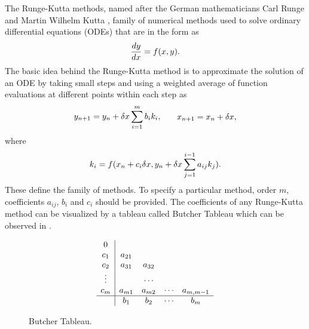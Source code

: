 \documentclass[a4paper,oneside,12pt]{report}
\numberwithin{equation}{chapter}
\begin{document}
The Runge-Kutta methods, named after the German mathematicians Carl Runge and Martin Wilhelm Kutta \cite{runge} \cite{kutta}, 
family of numerical methods
used to solve ordinary differential equations (ODEs) that are in the form as
\vspace{-10pt}\begin{equation} \label{eq:first-order-ODE}
    \deriv{y}{x} = f(x, y) .
\vspace{-10pt}\end{equation}
The basic idea behind the Runge-Kutta method is to approximate the solution of an ODE by taking small steps and using a weighted average 
of function evaluations at different points within each step as
\vspace{-10pt}\begin{equation} \label{eq:general-rk}
    \begin{aligned}
        y_{n+1} = y_n + \delta x \sum_{i=1}^{m} b_i k_i  ,
    \end{aligned}
    \qquad
    \begin{aligned}
        x_{n+1} = x_n + \delta x   ,
    \end{aligned}
\vspace{-10pt}\end{equation}
where 
\vspace{-10pt}\begin{eqnarray} \label{eq:general-rk-coef}
    k_i = f(x_n + c_i \delta x, y_n + \delta x \sum_{j = 1}^{i - 1}a_{ij}k_j) .
\vspace{-10pt}\end{eqnarray}
These  define the family of methods. To specify a particular method, order $m$, coefficients $a_{ij}$, $b_i$ and $c_i$ should be provided.
The coefficients of any Runge-Kutta method can be visualized by a tableau called Butcher Tableau which can be observed in .
\begin{figure}[h!]
    \[ 
    \begin{array} 
        {c|cccc}
        0\\
        c_1 & a_{21} \\
        c_2 & a_{31} & a_{32}\\
        \vdots& & \cdots& \\
        c_m & a_{m1} & a_{m2} & \cdots & a_{m,m-1}\\
        \hline
        & b_1 & b_2 &\cdots & b_m
    \end{array}
    \]
    \caption{Butcher Tableau.}
    \label{fig:Butcher}
\end{figure}
\end{document}

